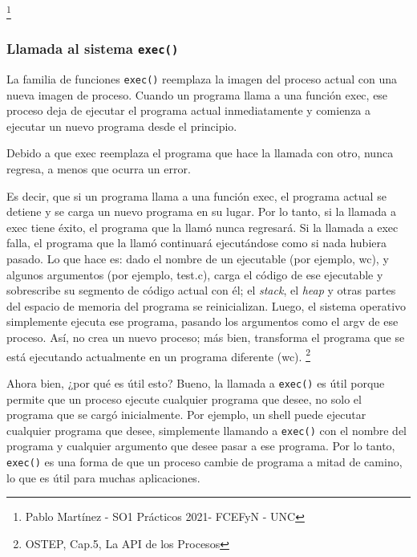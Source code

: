 \documentclass{article}
\begin{document}
\footnote{Pablo Martínez - SO1 Prácticos 2021- FCEFyN - UNC}

\subsubsection{Llamada al sistema \texttt{exec()}}

La familia de funciones \texttt{exec()} reemplaza la imagen del proceso actual con una nueva imagen de proceso. Cuando un programa llama a una función exec, ese proceso deja de ejecutar el programa actual inmediatamente y comienza a ejecutar un nuevo programa desde el principio.

\begin{mdframed}[backgroundcolor=gray!10]
Debido a que exec reemplaza el programa que hace la llamada con otro, nunca regresa, a menos que ocurra un error.
\end{mdframed}

Es decir, que si un programa llama a una función exec, el programa actual se detiene y se carga un nuevo programa en su lugar. Por lo tanto, si la llamada a exec tiene éxito, el programa que la llamó nunca regresará. Si la llamada a exec falla, el programa que la llamó continuará ejecutándose como si nada hubiera pasado. Lo que hace es: dado el nombre de un ejecutable (por ejemplo, wc), y algunos argumentos (por ejemplo, test.c), carga el código de ese ejecutable y sobrescribe su segmento de código actual con él; el \textit{stack}, el \textit{heap} y otras partes del espacio de memoria del programa se reinicializan. Luego, el sistema operativo simplemente ejecuta ese programa, pasando los argumentos como el argv de ese proceso. Así, no crea un nuevo proceso; más bien, transforma el programa que se está ejecutando actualmente en un programa diferente (wc). \footnote{OSTEP, Cap.5, La API de los Procesos}

Ahora bien, ¿por qué es útil esto? Bueno, la llamada a \texttt{exec()} es útil porque permite que un proceso ejecute cualquier programa que desee, no solo el programa que se cargó inicialmente. Por ejemplo, un shell puede ejecutar cualquier programa que desee, simplemente llamando a \texttt{exec()} con el nombre del programa y cualquier argumento que desee pasar a ese programa. Por lo tanto, \texttt{exec()} es una forma de que un proceso cambie de programa a mitad de camino, lo que es útil para muchas aplicaciones.
\end{document}
